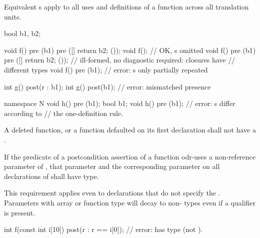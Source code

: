 \begin{note}
Equivalent
s
apply to all uses and definitions
of a function  across all translation units.
\end{note}
\begin{example}
\begin{codeblock}
bool b1, b2;

void f() pre (b1) pre ([]{ return b2; }());
void f();                       // OK, s omitted
void f() pre (b1) pre ([]{ return b2; }()); // ill-formed, no diagnostic required: closures have
                                            // different types
void f() pre (b1);              // error: s only partially repeated

int g() post(r : b1);
int g() post(b1);       // error: mismatched  presence

namespace N {
  void h() pre (b1);
  bool b1;
  void h() pre (b1);    // error: s differ according to
                        // the one-definition rule.
}
\end{codeblock}
\end{example}

\pnum
A deleted function,
or a function defaulted on its first declaration
shall not have a .

\pnum
If the predicate of a postcondition assertion
of a function 
odr-uses
a non-reference parameter of ,
that parameter
and the corresponding parameter on all declarations of 
shall have  type.
\begin{note}
This requirement applies
even to declarations that do not specify the .
Parameters with array or function type
will decay to non- types
even if a  qualifier is present.
\begin{example}
\begin{codeblock}
int f(const int i[10])
  post(r : r == i[0]);  // error:  has type  (not ).
\end{codeblock}
\end{example}
\end{note}

